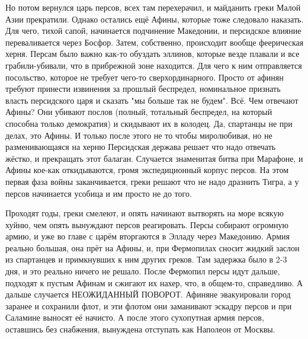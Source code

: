 Но потом вернулся царь персов, всех там перехерачил, и майданить греки Малой Азии прекратили. Однако остались ещё Афины, которые тоже следовало наказать. Для чего, тихой сапой, начинается подчинение Македонии, и персидское влияние переваливается через Босфор. Затем, собственно, происходит вообще феерическая херня. Персам было важно как-то обуздать эллинов, которые везде плавали и все грабили-убивали, что в прибрежной зоне находится. Для чего к ним отправляется посольство, которое не требует чего-то сверхординарного. Просто от афинян требуют принести извинения за прошлый беспредел, номинальное признать власть персидского царя и сказать "мы больше так не будем". Всё. Чем отвечают Афины? Они убивают послов (полный, тотальный беспредел, на который способна только демократия) и скидывают их в колодец. Да, спартанцы не при делах, это Афины. И только после этого не то чтобы миролюбивая, но не разменивающаяся на херню Персидская держава решает что надо отвечать жёстко, и прекращать этот балаган. Случается знаменитая битва при Марафоне, и Афины кое-как откидываются, громя экспедиционный корпус персов. На этом первая фаза войны заканчивается, греки решают что не надо дразнить Тигра, а у персов начинается усобица и им просто не до того.


Проходят годы, греки смелеют, и опять начинают вытворять на море всякую хуйню, чем опять вынуждают персов реагировать. Персы собирают огромную армию, и уже во главе с царём вторгаются в Элладу через Македонию. Армия реально большая, она прёт на Афины, и, при Фермопилах сносит жидкий заслон из спартанцев и примкнувших к ним других греков. Там задержка было в 2-3 дня, и это реально ничего не решало. После Фермопил персы идут дальше, подходят к пустым Афинам и сжигают их нахер, что, в общем-то, справедливо. А дальше случается НЕОЖИДАННЫЙ ПОВОРОТ. Афиняне эвакуировали город заранее и сохранили флот, и эти флотом они заманивают эскадру персов и при Саламине выносят её начисто. А после этого сухопутная армия персов, оставшись без снабжения, вынуждена отступать как Наполеон от Москвы.


